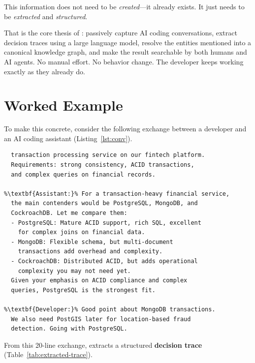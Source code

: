 This information does not need to be \emph{created}---it already exists.  It
just needs to be \emph{extracted} and \emph{structured}.

That is the core thesis of \sysname{}: passively capture AI coding
conversations, extract decision traces using a large language model, resolve
the entities mentioned into a canonical knowledge graph, and make the result
searchable by both humans and AI agents.  No manual effort.  No behavior
change.  The developer keeps working exactly as they already do.

\section{Worked Example}
\label{sec:worked-example}

To make this concrete, consider the following exchange between a developer and
an AI coding assistant (Listing~\ref{lst:conv}).

\begingroup
\lstset{style=bash, numbers=none, basicstyle=\small\ttfamily}
\begin{lstlisting}[caption={Developer--AI conversation about database selection.},label={lst:conv},escapechar=\%]
%\textbf{Developer:}% I need to select a database for a new
  transaction processing service on our fintech platform.
  Requirements: strong consistency, ACID transactions,
  and complex queries on financial records.

%\textbf{Assistant:}% For a transaction-heavy financial service,
  the main contenders would be PostgreSQL, MongoDB, and
  CockroachDB. Let me compare them:
  - PostgreSQL: Mature ACID support, rich SQL, excellent
    for complex joins on financial data.
  - MongoDB: Flexible schema, but multi-document
    transactions add overhead and complexity.
  - CockroachDB: Distributed ACID, but adds operational
    complexity you may not need yet.
  Given your emphasis on ACID compliance and complex
  queries, PostgreSQL is the strongest fit.

%\textbf{Developer:}% Good point about MongoDB transactions.
  We also need PostGIS later for location-based fraud
  detection. Going with PostgreSQL.
\end{lstlisting}
\endgroup

\noindent
From this 20-line exchange, \sysname{} extracts a structured \textbf{decision
trace} (Table~\ref{tab:extracted-trace}).

